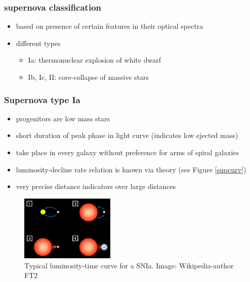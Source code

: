 \documentclass[a4paper, 11pt]{article}
\begin{document}
      \subsubsection{supernova classification}
        \begin{itemize}
          \item based on presence of certain features in their optical spectra
          \item different types
          \begin{itemize}
            \item Ia: thermonuclear explosion of white dwarf
            \item Ib, Ic, II: core-collapse of massive stars
          \end{itemize}
        \end{itemize}
      \subsubsection{Supernova type Ia}
        \begin{itemize}
          \item progenitors are low mass stars
          \item short duration of peak phase in light curve (indicates low ejected mass)
          \item take place in every galaxy without preference for arms of spiral galaxies
          \item luminosity-decline rate relation is known via theory (see Figure \ref{supcurv})
          \item very precise distance indicators over large distances
        \end{itemize}
        \begin{figure}
          \label{sntypes}
          \centering
          \includegraphics[width=0.4\textwidth]{SN_types.png}
          \caption{Typical luminosity-time curve for a SNIa. \newline \hfill Image: Wikipedia-author FT2}
        \end{figure}
\end{document}

